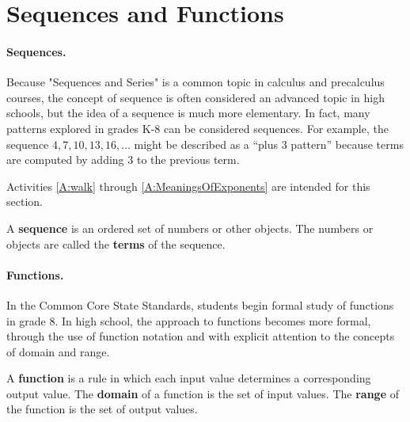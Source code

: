 \section{Sequences and Functions}
\paragraph{Sequences.}  Because "Sequences and Series" is a common topic in calculus and precalculus courses, the concept of sequence is often considered an advanced topic in high schools, but the idea of a sequence is much more elementary.  In fact, many patterns explored in grades K-8 can be considered sequences.  For example, the sequence $4, 7, 10, 13, 16, \dots$ might be described as a ``plus 3 pattern'' because terms are computed by adding 3 to the previous term.  
\begin{activitynote}
Activities \ref{A:walk} through \ref{A:MeaningsOfExponents} are intended for this section.  
\end{activitynote}
\begin{definition}
A \textbf{sequence} is an ordered set of numbers or other objects.  The numbers or objects are called the \textbf{terms} of the sequence.  
\end{definition}

\paragraph{Functions.}  In the Common Core State Standards, students begin formal study of functions in grade 8.  
In high school, the approach to functions becomes more formal, through the use of function notation and with explicit attention to the concepts of domain and range.   

\begin{definition}
A \textbf{function} is a rule in which each input value determines a corresponding output value.  The \textbf{domain} of a function is the set of input values.  The \textbf{range} of the function is the set of output values.
\end{definition}

